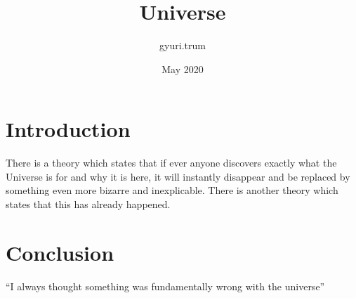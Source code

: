 \documentclass{article}
\title{Universe}
\author{gyuri.trum }
\date{May 2020}
\begin{document}
\maketitle

\section{Introduction}
There is a theory which states that if ever anyone discovers exactly what the Universe is for and why it is here, it will instantly disappear and be replaced by something even more bizarre and inexplicable.
There is another theory which states that this has already happened.

\section{Conclusion}
``I always thought something was fundamentally wrong with the universe'' \citep{adams1995hitchhiker}



\end{document}

